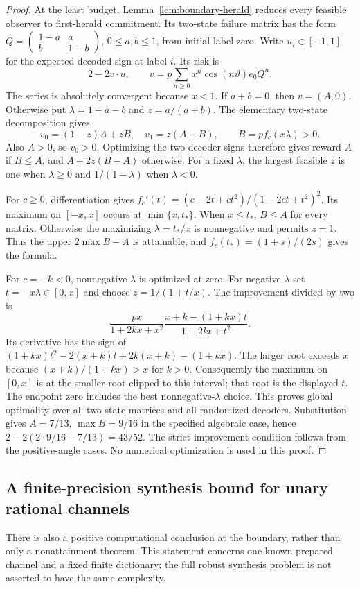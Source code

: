 \begin{proof}
At the least budget, Lemma~\ref{lem:boundary-herald} reduces every feasible observer to first-herald commitment. Its two-state failure matrix has the form
$Q=\left(\begin{smallmatrix}1-a&a\\b&1-b\end{smallmatrix}\right)$, $0\le a,b\le1$, from initial label zero. Write $u_i\in[-1,1]$ for the expected decoded sign at label $i$. Its risk is
\[
 2-2v\cdot u,\qquad
 v=p\sum_{n\ge0}x^n\cos(n\vartheta)e_0Q^n.
\]
The series is absolutely convergent because $x<1$. If $a+b=0$, then $v=(A,0)$. Otherwise put $\lambda=1-a-b$ and $z=a/(a+b)$. The elementary two-state decomposition gives
\[
 v_0=(1-z)A+zB,\quad v_1=z(A-B),\qquad
 B=p f_c(x\lambda)>0.
\]
Also $A>0$, so $v_0>0$. Optimizing the two decoder signs therefore gives reward $A$ if $B\le A$, and $A+2z(B-A)$ otherwise. For a fixed $\lambda$, the largest feasible $z$ is one when $\lambda\ge0$ and $1/(1-\lambda)$ when $\lambda<0$.

For $c\ge0$, differentiation gives
$f_c'(t)=(c-2t+ct^2)/(1-2ct+t^2)^2$. Its maximum on $[-x,x]$ occurs at $\min\{x,t_*\}$. When $x\le t_*$, $B\le A$ for every matrix. Otherwise the maximizing $\lambda=t_*/x$ is nonnegative and permits $z=1$. Thus the upper $2\max B-A$ is attainable, and $f_c(t_*)=(1+s)/(2s)$ gives the formula.

For $c=-k<0$, nonnegative $\lambda$ is optimized at zero. For negative $\lambda$ set $t=-x\lambda\in[0,x]$ and choose $z=1/(1+t/x)$. The improvement divided by two is
\[
 \frac{p x}{1+2kx+x^2}
       \frac{x+k-(1+kx)t}{1-2kt+t^2}.
\]
Its derivative has the sign of
$(1+kx)t^2-2(x+k)t+2k(x+k)-(1+kx)$.
The larger root exceeds $x$ because $(x+k)/(1+kx)>x$ for $k>0$. Consequently the maximum on $[0,x]$ is at the smaller root clipped to this interval; that root is the displayed $t$. The endpoint zero includes the best nonnegative-$\lambda$ choice. This proves global optimality over all two-state matrices and all randomized decoders. Substitution gives $A=7/13$, $\max B=9/16$ in the specified algebraic case, hence $2-2(2\cdot9/16-7/13)=43/52$. The strict improvement condition follows from the positive-angle cases. No numerical optimization is used in this proof.
\end{proof}

\subsection{A finite-precision synthesis bound for unary rational channels}
There is also a positive computational conclusion at the boundary, rather than only a nonattainment theorem. This statement concerns one known prepared channel and a fixed finite dictionary; the full robust synthesis problem is not asserted to have the same complexity.

